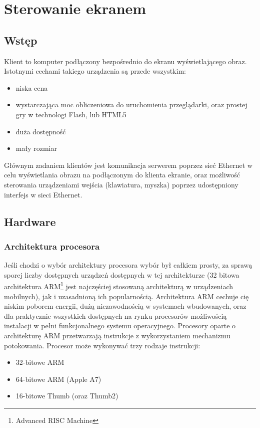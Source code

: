\section{Sterowanie ekranem}
\label{sec:component-controll-remote-screen} %

\subsection{Wstęp}

Klient to komputer podłączony bezpośrednio do ekranu wyświetlającego obraz. Istotnymi cechami takiego urządzenia są przede wszystkim:
\begin{itemize}
	\item niska cena
	\item wystarczająca moc obliczeniowa do uruchomienia przeglądarki, oraz prostej gry w technologi Flash, lub HTML5
	\item duża dostępność
	\item mały rozmiar
\end{itemize}

Głównym zadaniem klientów jest komunikacja serwerem poprzez sieć Ethernet w celu wyświetlania obrazu na podłączonym do klienta ekranie, oraz możliwość sterowania urządzeniami wejścia (klawiatura, myszka) poprzez udostępniony interfejs w sieci Ethernet.


\subsection{Hardware}

\subsubsection{Architektura procesora}
Jeśli chodzi o wybór architektury procesora wybór był całkiem prosty, za sprawą sporej liczby dostępnych urządzeń dostępnych w tej architekturze (32 bitowa architektura ARM\footnote{Advanced RISC Machine} jest najczęściej stosowaną architekturą w urządzeniach mobilnych\cite{acm}), jak i uzasadnioną ich popularnością. Architektura ARM cechuje cię niskim poborem energii, dużą niezawodnością w systemach wbudowanych, oraz dla praktycznie wszystkich dostępnych na rynku procesorów możliwością instalacji w pełni funkcjonalnego systemu operacyjnego.
Procesory oparte o architekturę ARM przetwarzają instrukcje z wykorzystaniem mechanizmu potokowania. Procesor może wykonywać trzy rodzaje instrukcji:
\begin{itemize}
	\item 32-bitowe ARM
	\item 64-bitowe ARM (Apple A7)
	\item 16-bitowe Thumb (oraz Thumb2)
\end{itemize}

